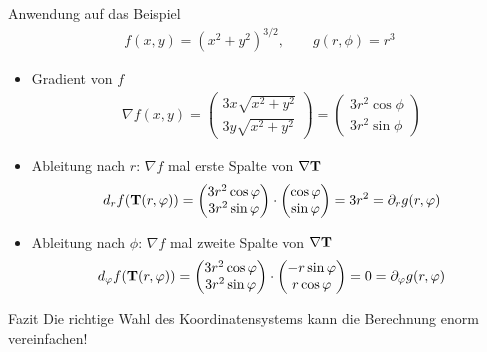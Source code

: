 \begin{frame}{Anwendung auf das Beispiel}
  \begin{gather*}
    f(x,y) = \left(x^2+y^2\right)^{3/2},\qquad g(r,\phi) = r^3
  \end{gather*}
  \begin{itemize}
  \item Gradient von $f$
    \begin{gather*}
      \nabla f(x,y) =
      \begin{pmatrix}
        3x\sqrt{x^2+y^2}\\3y\sqrt{x^2+y^2}
      \end{pmatrix}
      =
      \begin{pmatrix}
        3 r^2 \cos \phi\\3 r^2 \sin\phi
      \end{pmatrix}
    \end{gather*}
  \item Ableitung nach $r$: $\nabla f$ mal erste Spalte von $\nabla \mathbf{T}$
    \begin{gather*}
      d_r f(\mathbf{T}(r,\varphi)) =
      \begin{pmatrix}
        3 r^2 \cos \varphi\\3 r^2 \sin\varphi
      \end{pmatrix}\cdot
      \begin{pmatrix}
        \cos\varphi\\\sin\varphi
      \end{pmatrix} = 3r^2 = \partial_r g(r,\varphi)
    \end{gather*}
    \pause
  \item Ableitung nach $\phi$: $\nabla f$ mal zweite Spalte von $\nabla \mathbf{T}$
    \begin{gather*}
      d_\varphi f(\mathbf{T}(r,\varphi)) =
      \begin{pmatrix}
        3 r^2 \cos \varphi\\3 r^2 \sin\varphi
      \end{pmatrix}\cdot
      \begin{pmatrix}
        -r\sin\varphi\\r\cos\varphi
      \end{pmatrix} = 0 = \partial_\varphi g(r,\varphi)
    \end{gather*}
  \end{itemize}
\end{frame}

\begin{frame}
  \begin{block}{Fazit}
    Die richtige Wahl des Koordinatensystems kann die Berechnung enorm vereinfachen!
  \end{block}
\end{frame}

